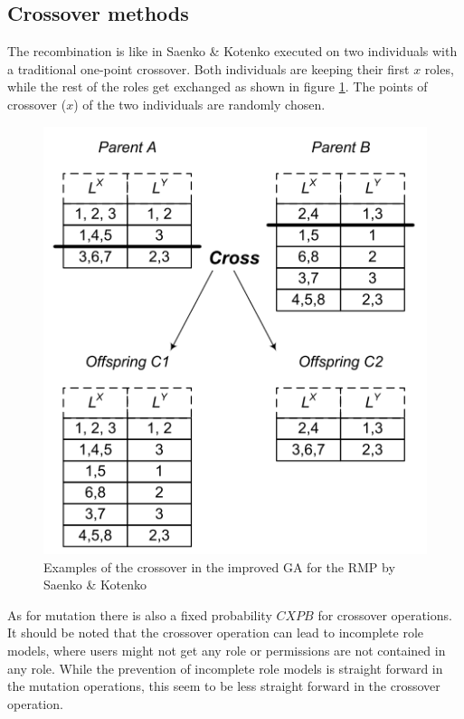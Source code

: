         \subsection{Crossover methods}
        The recombination is like in Saenko \& Kotenko\cite{saenko2012design} executed on two individuals with a traditional one-point crossover. Both individuals are keeping their first $x$ roles, while the rest of the roles get exchanged as shown in figure \ref{fig:crossover}. The points of crossover ($x$) of the two individuals are randomly chosen.
        \begin{figure}
            \centering
            \includegraphics[scale=0.8]{./Figures/crossover.png}
            \caption{Examples of the crossover in the improved GA for the RMP by Saenko \& Kotenko\cite{saenko2012design}}
            \label{fig:crossover}
        \end{figure}
        As for mutation there is also a fixed probability $CXPB$ for crossover operations. It should be noted that the crossover operation can lead to incomplete role models, where users might not get any role or permissions are not contained in any role. While the prevention of incomplete role models is straight forward in the mutation operations, this seem to be less straight forward in the crossover operation.
